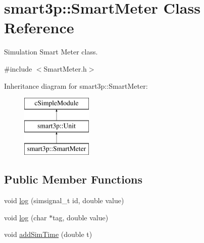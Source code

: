 \hypertarget{classsmart3p_1_1SmartMeter}{}\section{smart3p\+:\+:Smart\+Meter Class Reference}
\label{classsmart3p_1_1SmartMeter}


Simulation Smart Meter class.  




{\ttfamily \#include $<$Smart\+Meter.\+h$>$}

Inheritance diagram for smart3p\+:\+:Smart\+Meter\+:\begin{figure}[H]
\begin{center}
\leavevmode
\includegraphics[height=3.000000cm]{classsmart3p_1_1SmartMeter}
\end{center}
\end{figure}
\subsection*{Public Member Functions}
\begin{DoxyCompactItemize}
\item 
void \hyperlink{classsmart3p_1_1SmartMeter_ac65e2f27b0a9d2545000baac6e1e574d}{log} (simsignal\+\_\+t id, double value)
\item 
void \hyperlink{classsmart3p_1_1SmartMeter_af92e8b7e3eaf5d1ec6e3c3f5082e8c14}{log} (char $\ast$tag, double value)
\item 
void \hyperlink{classsmart3p_1_1SmartMeter_a3b18ccd6e38a60e4e96d7e6d5b971dbe}{add\+Sim\+Time} (double t)
\end{DoxyCompactItemize}
